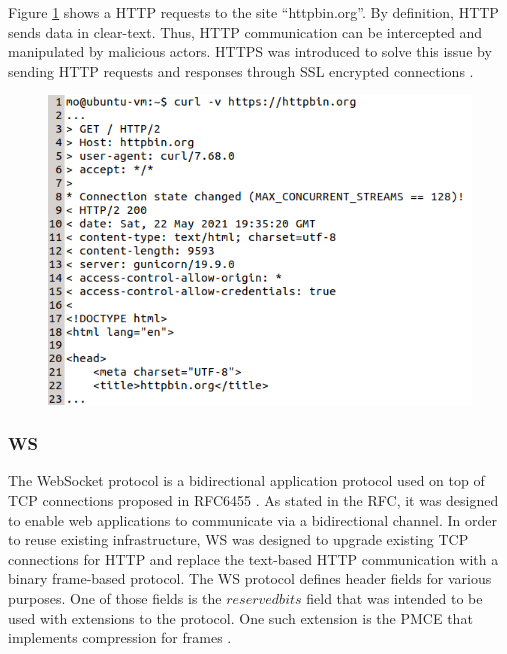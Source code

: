 Figure \ref{fig:curl-http-request-respose} shows a \ac{HTTP} requests to the site \enquote{httpbin.org}. By definition, \ac{HTTP} sends data in clear-text. Thus, \ac{HTTP} communication can be intercepted and manipulated by malicious actors. \ac{HTTPS} was introduced to solve this issue by sending \ac{HTTP} requests and responses through \ac{SSL} encrypted connections \cite{rfc2818}.

\begin{figure}[h!]
    \centering
    \includegraphics[width=12cm]{img/ch03/http-request-response.png}
    \label{fig:curl-http-request-respose}
\end{figure}

\subsubsection{\ac{WS}}
The WebSocket protocol is a bidirectional application protocol used on top of \ac{TCP} connections proposed in RFC6455 \cite{rfc6455}. As stated in the RFC, it was designed to enable web applications to communicate via a bidirectional channel. In order to reuse existing infrastructure, \ac{WS} was designed to upgrade existing \ac{TCP} connections for \ac{HTTP} and replace the text-based \ac{HTTP} communication with a binary frame-based protocol. The \ac{WS} protocol defines header fields for various purposes. One of those fields is the $reserved bits$ field that was intended to be used with extensions to the protocol. One such extension is the \ac{PMCE} that implements compression for frames \cite{rfc7692}.

